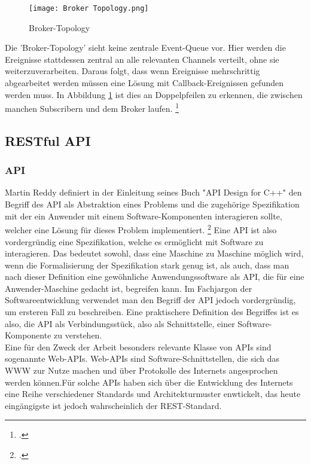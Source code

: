 \begin{figure}[H]
  \centering
  \texttt{[image: Broker Topology.png]}
  \caption[Broker-Topology]{Broker-Topology \footnotemark}
  \label{brokertop}
\end{figure}
Die 'Broker-Topology' sieht keine zentrale Event-Queue vor. Hier werden die Ereignisse stattdessen zentral an alle relevanten Channels verteilt, ohne sie weiterzuverarbeiten. Daraus folgt, dass wenn Ereignisse mehrschrittig abgearbeitet werden müssen eine Lösung mit Callback-Ereignissen gefunden werden muss. In Abbildung \ref{brokertop} ist dies an Doppelpfeilen zu erkennen, die zwischen manchen Subscribern und dem Broker laufen. \footcite[Vgl. ][]{wickramarachchi_2017_event}

\subsection{RESTful API}
\subsubsection*{API}
Martin Reddy definiert in der Einleitung seines Buch "API Design for C++" den Begriff des \ac{API} als Abstraktion eines Problems und die zugehörige Spezifikation mit der ein Anwender mit einem Software-Komponenten interagieren sollte, welcher eine Lösung für dieses Problem implementiert. \footcite[Vgl. ][S. 1]{reddy2011api} Eine API ist also vordergründig eine Spezifikation, welche es ermöglicht mit Software zu interagieren. Das bedeutet sowohl, dass eine Maschine zu Maschine möglich wird, wenn die Formalisierung der Spezifikation stark genug ist, als auch, dass man nach dieser Definition eine gewöhnliche Anwendungssoftware als API, die für eine Anwender-Maschine gedacht ist, begreifen kann. Im Fachjargon der Softwareentwicklung verwendet man den Begriff der \ac{API} jedoch vordergründig, um ersteren Fall zu beschreiben. Eine praktischere Definition des Begriffes ist es also, die API als Verbindungsstück, also als Schnittstelle, einer Software-Komponente zu verstehen. \\
Eine für den Zweck der Arbeit besonders relevante Klasse von \ac{API}s sind sogenannte Web-\ac{API}s. Web-\ac{API}s sind Software-Schnittstellen, die sich das \ac{WWW} zur Nutze machen und über Protokolle des Internets angesprochen werden können.\citepls Für solche \ac{API}s haben sich über die Entwicklung des Internets eine Reihe verschiedener Standards und Architekturmuster enwtickelt, das heute eingängigste ist jedoch wahrscheinlich der REST-Standard. \citepls
